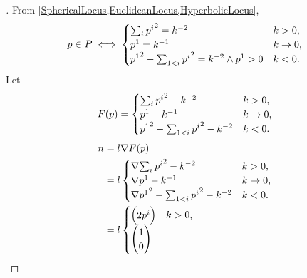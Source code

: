 \documentclass[stu, babel, american, biblatex, a4paper, leqno, draftall]{apa7}
\begin{document}
\begin{proof}[]
    From \cref{SphericalLocus,EuclideanLocus,HyperbolicLocus},
    \begin{equation*}
        p \in P \iff
        \begin{cases}
           \sum_{i}{{\tensor{p}{^i}}^2}=k^{-2} & \text{$k>0$,} \\
           \tensor{p}{^1} = k^{-1} \iffalse{\wedge \tensor{p}{^i} = \tensor{\theta}{^{i-1}}}\fi & \text{$k\to 0$,} \\
             {\tensor{p}{^1}}^2 - \sum_{1<i}{{\tensor{p}{^i}}^2}=k^{-2} \wedge \tensor{p}{^1} > 0 & \text{$k<0$.} \\
        \end{cases}
    \end{equation*}
    Let
    \begin{equation*}
        F(p) = \begin{cases}
           \sum_{i}{{\tensor{p}{^i}}^2}-k^{-2} & \text{$k>0$,} \\
           \tensor{p}{^1} - k^{-1} & \text{$k\to 0$,} \\
             {\tensor{p}{^1}}^2 - \sum_{1<i}{{\tensor{p}{^i}}^2}-k^{-2} & \text{$k<0$.} \\
        \end{cases}
    \end{equation*}
    \begin{align*}
        n
        &= l \nabla F(p) \\
        &= l \begin{cases}
            \nabla{\sum_{i}{{\tensor{p}{^i}}^2}-k^{-2}} & \text{$k>0$,} \\
            \nabla{\tensor{p}{^1} - k^{-1}} & \text{$k\to 0$,} \\
            \nabla{{\tensor{p}{^1}}^2 - \sum_{1<i}{{\tensor{p}{^i}}^2}-k^{-2}} & \text{$k<0$.} \\
         \end{cases} \\
         &= l \begin{cases}
            \begin{pmatrix}
                2\tensor{p}{^i} \\
            \end{pmatrix} & \text{$k>0$,} \\
            \begin{pmatrix}
                1 \\
                0 \\

\end{pmatrix}
\end{cases}
\end{align*}
\end{proof}
\end{document}
